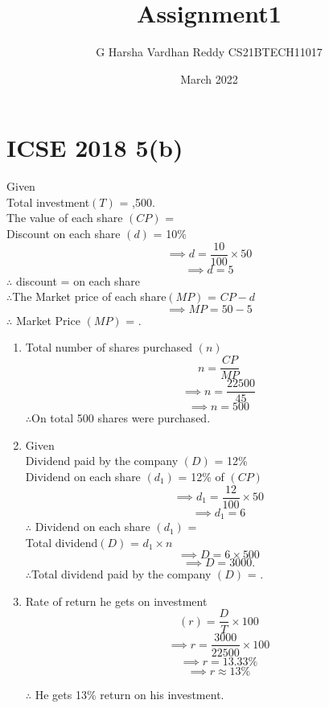 \documentclass[journal,12pt,twocolumn]{IEEEtran}
\title{Assignment1}
\author{G Harsha Vardhan Reddy CS21BTECH11017}
\date{March 2022}
\begin{document}
\maketitle
\section*{\textbf{ICSE 2018 5(b)}}
Given\\
Total investment\((T)\) = ,500.\\
The value of each share \( (CP) \) = \\
Discount on each share \( (d)\) = 10\%  \[\implies d =\frac{10}{100}\times50\]
 \[\implies d = 5\]
$ \therefore$ discount =  on each share\\
$\therefore$The Market price of each share\((MP)\) = \( CP - d \)\[\implies MP = 50 - 5 \]
$\therefore$ Market Price \((MP)\) =  . 
\begin{enumerate}
    \item 
    Total number of shares purchased \((n)\) \[ n =\frac{CP}{MP}\]
    \[\implies n = \frac{22500}{45}\]
         \[\implies n = 500\]
    $\therefore$On total 500 shares were purchased.
    \item
    Given\\
    Dividend paid by the company \((D)\) = 12\%\\
    Dividend on each share \((d_1)\) = 12\% of \((CP)\)  
    \[\implies d_1 = \frac{12}{100}\times 50 \]
    \[\implies d_1 = 6\]
    $\therefore$ Dividend on each share \((d_1)\) = \\
   Total dividend\((D)\) = $ d_1 \times n $
  \[\implies D = 6 \times 500\]
  \[\implies D = 3000.\]
    $\therefore$Total dividend paid by the company \((D)\) = .
    \item
    Rate of return he gets on investment
    \[ (r) = \frac{D}{T} \times 100\]
    \[\implies r = \frac{3000}{22500}\times 100\]
    \[\implies r = 13.33\% \]
    \[\implies r \approx 13\%\]
    
    $\therefore$ He gets 13\% return on his investment.
\end{enumerate}

\end{document}
